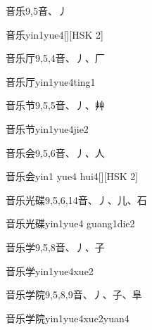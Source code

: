 \begin{Entry}{音乐}{9,5}{⾳、⼃}
  \begin{Phonetics}{音乐}{yin1yue4}[][HSK 2]
  \end{Phonetics}
\end{Entry}

\begin{Entry}{音乐厅}{9,5,4}{⾳、⼃、⼚}
  \begin{Phonetics}{音乐厅}{yin1yue4ting1}
  \end{Phonetics}
\end{Entry}

\begin{Entry}{音乐节}{9,5,5}{⾳、⼃、⾋}
  \begin{Phonetics}{音乐节}{yin1yue4jie2}
  \end{Phonetics}
\end{Entry}

\begin{Entry}{音乐会}{9,5,6}{⾳、⼃、⼈}
  \begin{Phonetics}{音乐会}{yin1 yue4 hui4}[][HSK 2]
  \end{Phonetics}
\end{Entry}

\begin{Entry}{音乐光碟}{9,5,6,14}{⾳、⼃、⼉、⽯}
  \begin{Phonetics}{音乐光碟}{yin1yue4 guang1die2}
  \end{Phonetics}
\end{Entry}

\begin{Entry}{音乐学}{9,5,8}{⾳、⼃、⼦}
  \begin{Phonetics}{音乐学}{yin1yue4xue2}
  \end{Phonetics}
\end{Entry}

\begin{Entry}{音乐学院}{9,5,8,9}{⾳、⼃、⼦、⾩}
  \begin{Phonetics}{音乐学院}{yin1yue4xue2yuan4}
  \end{Phonetics}
\end{Entry}

